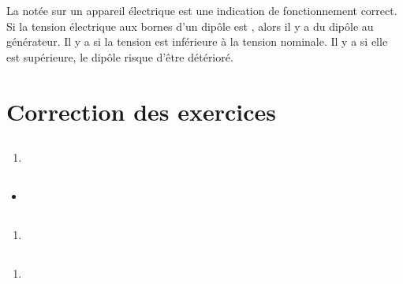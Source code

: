 \documentclass[12pt,a4paper]{article}
\begin{document}
\begin{mybilan}
	La  notée sur un appareil électrique est une indication de fonctionnement correct.
	Si la tension électrique aux bornes d'un dipôle est , alors il y a  du dipôle au générateur. 
	Il y a  si la tension est inférieure à la tension nominale. Il y a  si elle est supérieure, le dipôle risque d'être détérioré. 
\end{mybilan}

\begin{myex}
\end{myex}
\appendix

\newpage

\section*{Correction des exercices}

\subsection*{}

\begin{enumerate}[label=\alph*)]
	\item 
\end{enumerate}

\subsection*{}

\begin{multicols}{2}
	\begin{itemize}
		\item 
	\end{itemize}
\end{multicols}

\subsection*{}
\begin{multicols}{2}
	\begin{enumerate}
		\item 
	\end{enumerate}
\end{multicols}

\subsection*{}


	\begin{enumerate}[label=\alph*)]
		\item 
	\end{enumerate}
\end{document}

